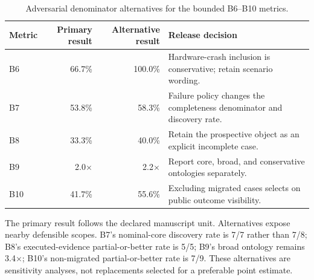 \begin{table}[tp]
\centering
\caption{Adversarial denominator alternatives for the bounded B6--B10 metrics.}
\label{tab:s-denominator-sensitivity}
\begin{threeparttable}
\begin{tabularx}{\linewidth}{@{}lrrL@{}}
\toprule
Metric & Primary result & Alternative result & Release decision \\
\midrule
B6 & 66.7\% & 100.0\% & Hardware-crash inclusion is conservative; retain scenario wording. \\
B7 & 53.8\% & 58.3\% & Failure policy changes the completeness denominator and discovery rate. \\
B8 & 33.3\% & 40.0\% & Retain the prospective object as an explicit incomplete case. \\
B9 & 2.0$\times$ & 2.2$\times$ & Report core, broad, and conservative ontologies separately. \\
B10 & 41.7\% & 55.6\% & Excluding migrated cases selects on public outcome visibility. \\
\bottomrule
\end{tabularx}
\begin{tablenotes}[flushleft]\footnotesize
\item The primary result follows the declared manuscript unit. Alternatives expose nearby defensible scopes. B7's nominal-core discovery rate is 7/7 rather than 7/8; B8's executed-evidence partial-or-better rate is 5/5; B9's broad ontology remains 3.4$\times$; B10's non-migrated partial-or-better rate is 7/9. These alternatives are sensitivity analyses, not replacements selected for a preferable point estimate.
\end{tablenotes}
\end{threeparttable}
\end{table}
